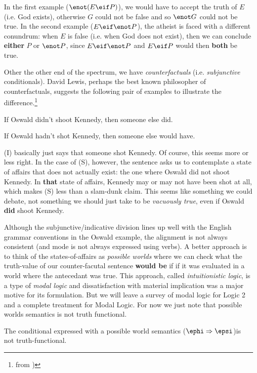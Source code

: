 In the first example ($\enot(E\eif P)$), we would have to accept the truth of
$E$ (i.e. God exists), otherwise $G$ could not be false and so $\enot G$ could
not be true. In the second example ($E\eif\enot P$), the atheist is faced with
a different conundrum: when $E$ is false (i.e. when God does not exist), then
we can conclude \textbf{either} $P$ or $\enot P$, since $E\eif\enot P$ and
$E\eif P$ would then \textbf{both} be true.

Other the other end of the spectrum, we have \emph{counterfactuals} (i.e.
\emph{subjunctive} conditionals). David Lewis, perhaps the best known
philosopher of counterfactuals, suggests the following pair of examples
to illustrate the difference.\footnote{from \cite[][p 162]{Smi20})}

\begin{argument}
\item[I:] If Oswald didn't shoot Kennedy, then someone else did.
\item[S:] If Oswald hadn't shot Kennedy, then someone else would have.
\end{argument}

(I) basically just says that someone shot Kennedy. Of course, this seems more
or less right. In the case of (S), however, the sentence asks us to contemplate
a state of affairs that does not actually exist: the one where Oswald did not
shoot Kennedy. In \textbf{that} state of affairs, Kennedy may or may not have
been shot at all, which makes (S) less than a slam-dunk claim. This seems like
something we could debate, not something we should just take to be
\emph{vacuously true}, even if Oswald \textbf{did} shoot Kennedy.

Although the subjunctive/indicative division lines up well with the English
grammar conventions in the Oswald example, the alignment is not always
consistent (and mode is not always expressed using verbs). A better approach
is to think of the states-of-affairs as \emph{possible worlds} where we can
check what the truth-value of our counter-facutal sentence \textbf{would be} if
if it was evaluated in a world where the antecedant was true. This approach,
called \emph{intuitionistic logic}, is a type of \emph{modal logic} and
dissatisfaction with material implication was a major motive for its
formulation. But we will leave a survey of modal logic for Logic 2 and a
complete treatment for Modal Logic. For now we just note that possible worlds
semantics is not truth functional.

\begin{observation}
  The conditional expressed with a possible world semantics
  ($\ephi\Rightarrow\epsi$)is not truth-functional.
\end{observation}

